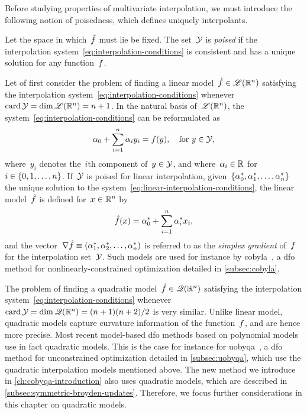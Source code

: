 Before studying properties of multivariate interpolation, we must introduce the following notion of poisedness, which defines uniquely interpolants.

\begin{definition}[Poisedness]
    Let the space in which~$\objm$ must lie be fixed.
    The set~$\xpt$ is \emph{poised} if the interpolation system~\cref{eq:interpolation-conditions} is consistent and has a unique solution for any function~$f$.
\end{definition}

Let of first consider the problem of finding a linear model~$\objm \in \lpoly$ satisfying the interpolation system~\cref{eq:interpolation-conditions} whenever~$\card \xpt = \dim \lpoly = n + 1$.
In the natural basis of~$\mathscr{L}(\mathbb{R}^n)$, the system~\cref{eq:interpolation-conditions} can be reformulated as
\begin{equation}
    \label{eq:linear-interpolation-conditions}
    \alpha_0 + \sum_{i = 1}^n \alpha_i y_i = \obj(y), \quad \text{for~$y \in \xpt$},
\end{equation}
where~$y_i$ denotes the~$i$th component of~$y \in \xpt$, and where~$\alpha_i \in \mathbb{R}$ for~$i \in \{0, 1, \dots, n\}$.
If~$\xpt$ is poised for linear interpolation, given~$\{\alpha_0^{\ast}, \alpha_1^{\ast}, \dots, \alpha_n^{\ast}\}$ the unique solution to the system~\cref{eq:linear-interpolation-conditions}, the linear model~$\objm$ is defined for~$x \in \mathbb{R}^n$ by
\begin{equation*}
    \objm(x) = \alpha_0^{\ast} + \sum_{i = 1}^n \alpha_i^{\ast} x_i,
\end{equation*}
and the vector~$\nabla \objm \equiv (\alpha_1^{\ast}, \alpha_2^{\ast}, \dots, \alpha_n^{\ast})$ is referred to as the \emph{simplex gradient} of~$f$ for the interpolation set~$\xpt$.
Such models are used for instance by \gls{cobyla}~\cite{Powell_1994}, a \gls{dfo} method for nonlinearly-constrained optimization detailed in \cref{subsec:cobyla}.

The problem of finding a quadratic model~$\objm \in \qpoly$ satisfying the interpolation system~\cref{eq:interpolation-conditions} whenever~$\card \xpt = \dim \qpoly = (n + 1)(n + 2) / 2$ is very similar.
Unlike linear model, quadratic models capture curvature information of the function~$f$, and are hence more precise.
Most recent model-based \gls{dfo} methods based on polynomial models use in fact quadratic models.
This is the case for instance for \gls{uobyqa}~\cite{Powell_2002}, a \gls{dfo} method for unconstrained optimization detailed in \cref{subsec:uobyqa}, which use the quadratic interpolation models mentioned above.
The new method we introduce in \cref{ch:cobyqa-introduction} also uses quadratic models, which are described in \cref{subsec:symmetric-broyden-updates}.
Therefore, we focus further considerations in this chapter on quadratic models.

